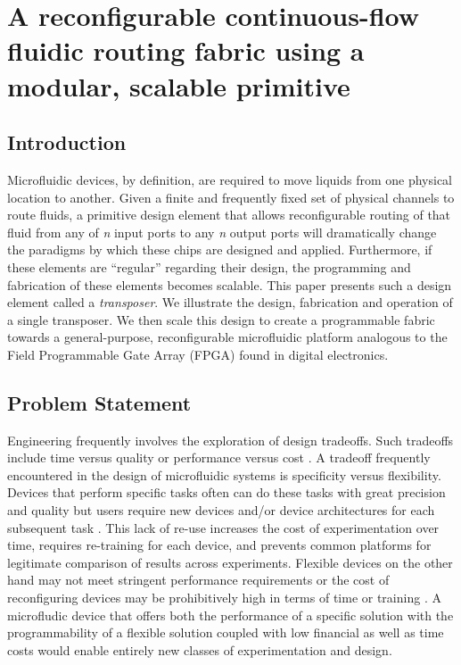 \chapter{A reconfigurable continuous-flow fluidic routing fabric using a modular, scalable primitive}
\label{chapter:xposer}
\thispagestyle{myheadings}

\graphicspath{{3_xposer/Figures/}}

\section{Introduction}
\label{sec:xposer_intro}
Microfluidic devices, by definition, are required to move liquids from one physical location to another. Given a finite and frequently fixed set of physical channels to route fluids, a primitive design element that allows reconfigurable routing of that fluid from any of  \textit{n} input ports to any \textit{n} output ports will dramatically change the paradigms by which these chips are designed and applied. Furthermore, if these elements are ``regular'' regarding their design, the programming and fabrication of these elements becomes scalable. This paper presents such a design element called a \textit{transposer}. We illustrate the design, fabrication and operation of a single transposer. We then scale this design to create a programmable fabric towards a general-purpose, reconfigurable microfluidic platform analogous to the Field Programmable Gate Array (FPGA) found in digital electronics.

\section{Problem Statement}
\label{sec:xposer_ps}
Engineering frequently involves the exploration of design tradeoffs. Such tradeoffs include time versus quality or performance versus cost \cite{otto1991trade}. A tradeoff frequently encountered in the design of microfluidic systems is specificity versus flexibility. Devices that perform specific tasks often can do these tasks with great precision and quality but users require new devices and/or device architectures for each subsequent task \cite{fidalgo2011}. This lack of re-use increases the cost of experimentation over time, requires re-training for each device, and prevents common platforms for legitimate comparison of results across experiments. Flexible devices on the other hand may not meet stringent performance requirements or the cost of reconfiguring devices may be prohibitively high in terms of time or training \cite{thies2008}. A microfludic device that offers both the performance of a specific solution with the programmability of a flexible solution coupled with low financial as well as time costs would enable entirely new classes of experimentation and design.

